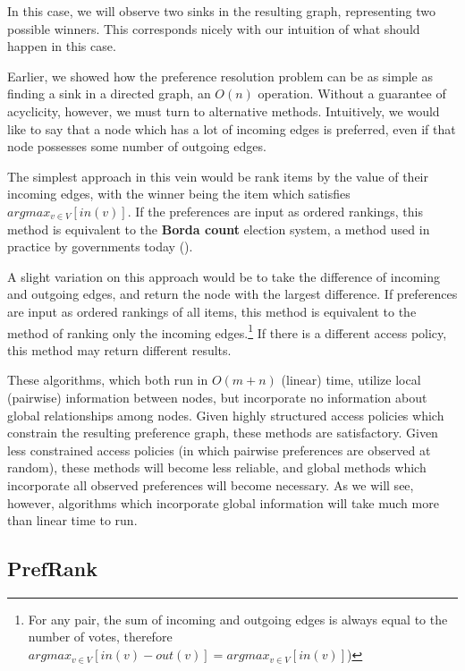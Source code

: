 In this case, we will observe two sinks in the resulting graph, representing two possible winners.
This corresponds nicely with our intuition of what should happen in this case.

\bigskip

Earlier, we showed how the preference resolution problem can be as simple as finding a sink in a directed graph, an $O(n)$ operation.
Without a guarantee of acyclicity, however, we must turn to alternative methods.
Intuitively, we would like to say that a node which has a lot of incoming edges is preferred, even if that node possesses some number of outgoing edges.

\bigskip

The simplest approach in this vein would be rank items by the value of their incoming edges, with the winner being the item which satisfies $argmax_{v \in V}[in(v)]$.
If the preferences are input as ordered rankings, this method is equivalent to the \textbf{Borda count} election system, a method used in practice by governments today (\cite{reilly:2002}).

\bigskip

A slight variation on this approach would be to take the difference of incoming and outgoing edges, and return the node with the largest difference.
If preferences are input as ordered rankings of all items, this method is equivalent to the method of ranking only the incoming edges.\footnote{For any pair, the sum of incoming and outgoing edges is always equal to the number of votes, therefore $argmax_{v \in V} [in(v) - out(v)] = argmax_{v \in V}[in(v)]$)}
If there is a different access policy, this method may return different results.

These algorithms, which both run in $O(m + n)$ (linear) time, utilize local (pairwise) information between nodes, but incorporate no information about global relationships among nodes.
Given highly structured access policies which constrain the resulting preference graph, these methods are satisfactory.
Given less constrained access policies (in which pairwise preferences are observed at random), these methods will become less reliable, and global methods which incorporate all observed preferences will become necessary.
As we will see, however, algorithms which incorporate global information will take much more than linear time to run.

\subsection{PrefRank}

